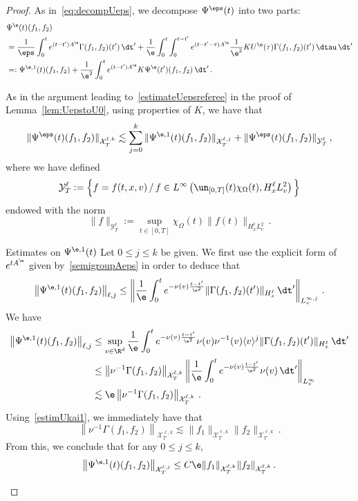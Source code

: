 \begin{proof}
As in~\eqref{eq:decompUeps}, we decompose $\Psi^\eps(t)$ into two parts:
\begin{align*}
&\Psi^{\e}(t) (f_1,f_2) \\
&= \frac{1}{\eps} \int_0^te^{(t-{t'})A^\e}\Gamma(f_1,f_2)({t'}) \, \dt' + \frac{1}{\e} \int_0^t \int_0^{t-{t'}} e^{(t-{t'}-\tau)A^\e} \frac{1}{\e^2} K U^\e(\tau)\Gamma(f_1,f_2)({t'}) \, \dtau \, \dt' \\
&=: \Psi^{\e,1}(t)(f_1,f_2) + \frac{1}{\e^2} \int_0^t e^{(t-{t'})A^\e} K \Psi^{\e}({t'})(f_1,f_2) \, \dt' \,.
\end{align*}

As in the argument leading to~\eqref{estimateUepsreferee} in the proof of Lemma~\ref{lem:UepstoU0}, using properties of $K$, we have that
\begin{equation}\label{estimatePsiPsi1}
\| \Psi^\eps (t)(f_1,f_2)\|_{{\mathcal X}_T^{\ell,k} } \lesssim \sum_{j=0}^k \|\Psi^{\e,1}(t)(f_1,f_2)\|_{{\mathcal X}_T^{\ell,j}} + \| \Psi^\eps (t)(f_1,f_2)\|_{{\mathcal Y}_T^\ell}\,,
\end{equation}
where we have defined
\[
\mathcal{Y}_T^\ell :=
\Big\{f = f(t,x,v) \, / \, f\in L^\infty\left(\un_{[0,T]}(t)\chi_\Omega(t),H^\ell_xL^2_v\right)\Big\}
\]
endowed with the norm
\[
\|f\|_{\mathcal{Y}_T^\ell }:=\sup_{t\in [0,T]}\chi_\Omega(t)\|f(t)\|_{H^\ell_xL^2_v}\,.
\]

\begin{step}{Estimates on $\Psi^{\e,1}(t)$}
Let $0 \le j \le k$ be given. We first use the explicit form of~$e^{tA^\e}$ given by~\eqref{semigroupAeps} in order to deduce that
\[
\left\|\Psi^{\e,1}(t)(f_1,f_2)\right\|_{{\ell,j}} \le
\left\| \frac{1}{\e} \int_0^t e^{-\nu(v)\frac{t-t'}{\e^2}} \|\Gamma(f_1,f_2)(t')\|_{H^\ell_x} \, \dt' \right\|_{L^{\infty,j}_v}\,.
\]
We have
\begin{equation}\label{eq:Psiepsellj}
\begin{aligned}
\left\|\Psi^{\e,1}(t)(f_1,f_2)\right\|_{{\ell,j}} 
&\le\sup_{v \in \R^d} \frac{1}{\e} \int_0^t e^{-\nu(v)\frac{t-{t'}}{\e^2}} \nu(v) \nu^{-1}(v) \langle v \rangle^j \| \Gamma(f_1,f_2) ({t'})\|_{H^\ell_x} \, \dt' \\
&\le \left\| \nu^{-1} \Gamma (f_1,f_2) \right\|_{\mathcal{X}_T^{\ell,k} } \left\| \frac{1}{\e} \int_0^t e^{-\nu(v)\frac{t-{t'}}{\e^2} } \nu(v) \, \dt' \right\|_{L^\infty_v} \\
&\lesssim \e \left\| \nu^{-1} \Gamma (f_1,f_2) \right\|_{\mathcal{X}_T^{\ell,k} }\,.
\end{aligned}
\end{equation}
Using~\eqref{estimUkai1}, we immediately have that
\[
\left\| \nu^{-1} \Gamma (f_1,f_2) \right\|_{\mathcal{X}^{\ell,k}_T} \lesssim \|f_1\|_{\mathcal{X}^{\ell,k}_T} \|f_2\|_{\mathcal{X}^{\ell,k}_T}\,.
\]
From this, we conclude that for any $0 \le j \le k$,
\[
\left\|\Psi^{\e,1}(t)(f_1,f_2)\right\|_{\mathcal{X}_T^{\ell,j} } \le C\e \|f_1\|_{\mathcal{X}_T^{\ell,k} }\|f_2\|_{\mathcal{X}^{\ell,k}_T} \,.
\]
\end{step}


\end{proof}
